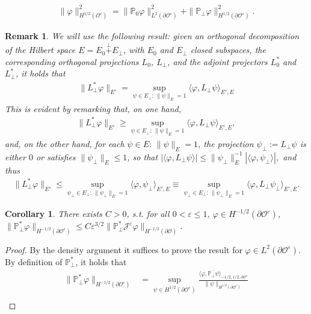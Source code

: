 \documentclass[]{article}
\newtheorem{corollary}{Corollary}
\newtheorem{remark}{Remark}
\numberwithin{equation}{section}
\numberwithin{theorem}{section}
\numberwithin{lemma}{section}
\numberwithin{corollary}{section}
\numberwithin{proposition}{section}
\numberwithin{definition}{section}
\newcommand{\re}{\varepsilon}
\renewcommand{\O}{\mathcal{O}}
\begin{document}
\begin{appendices}
\begin{align}
			\label{eq:split_norm_H_half}
			\|\varphi\|^2_{H^{1/2}(\O^{\re})}=\|\mathbb{P}_0\varphi\|^2_{L^2(\partial\mathcal{O}^{\re})}+\|\mathbb{P}_{\perp}\varphi\|^2_{H^{1/2}(\partial\mathcal{O}^{\re})}.
		\end{align}
		\begin{remark}
			\label{rem:general_rsult}
			We will use the following result: given an orthogonal decomposition of the Hilbert space $E=E_0\overset{\perp}{+}E_{\perp}$, with $E_0$ and $E_{\perp}$ closed subspaces, the corresponding orthogonal projections $L_0$,  $L_{\perp}$, and the adjoint projectors $L_0^*$ and $L^*_{\perp}$, it holds that 
			\begin{align*}
				\|L_{\perp}^*\varphi\|_{E'}=\sup\limits_{\psi\in E_{\perp}: \,\|\psi\|_E=1}\langle \varphi, L_{\perp}\psi\rangle_{E', E}
			\end{align*}
			This is evident by remarking that, on one hand, 
			\begin{align*}
				\|L_{\perp}^*\varphi\|_{E'}\geq \sup\limits_{\psi\in E_{\perp}: \,\|\psi\|_E=1}\langle \varphi, L_{\perp}\psi\rangle_{E', E},
			\end{align*}
			and, on the other hand, for each $\psi\in E: \, \|\psi\|_{E}=1$, the projection $\psi_{\perp}:=L_{\perp}\psi$ is either $0$ or satisfies $\|\psi_{\perp}\|_E\leq 1$, so that $
			|\langle \varphi, L_{\perp}\psi\rangle|\leq \|\psi_{\perp}\|^{-1}_E	|\langle \varphi, \psi_{\perp}\rangle|,$ 
			and thus 
			\begin{align*}
				\|L_{\perp}^*\varphi\|_{E'}\leq \sup\limits_{\psi_{\perp}\in E_{\perp}: \,\|\psi_{\perp}\|_E=1}\langle \varphi, \psi_{\perp}\rangle_{E', E}\equiv \sup\limits_{\psi_{\perp}\in E_{\perp}: \,\|\psi_{\perp}\|_E=1}\langle \varphi, L_{\perp}\psi_{\perp}\rangle_{E', E}.
			\end{align*}
		\end{remark}
		\begin{corollary}
			\label{cor:pperp}
			There exists $C>0$, s.t. for all $0<\re\leq 1$, $\varphi\in H^{-1/2}(\partial \O^{\re})$,  $\|\mathbb{P}_{\perp}^*{\varphi}\|_{H^{-1/2}(\partial\mathcal{O}^{\re})}\leq C\re^{3/2}\|\mathbb{P}_{\perp}^*\mathcal{J}^{\re}{\varphi}\|_{H^{-1/2}(\partial\mathcal{O})}$.
		\end{corollary}
		\begin{proof}
			By the density argument it suffices to prove the result for $\varphi\in L^2(\partial\O^{\re})$. 
			By definition of $\mathbb{P}_{\perp}^*$, it holds that 
			\begin{align*}
				\|\mathbb{P}_{\perp}^*{\varphi}\|_{H^{-1/2}(\partial\mathcal{O}^{\re})}&=\sup\limits_{{\psi}\in H^{1/2}(\partial\mathcal{O}^{\re})}\frac{\langle{\varphi}, \overline{\mathbb{P}_{\perp}{\psi}}\rangle_{-1/2,1/2,\partial\mathcal{O}^{\re}}}{\|{\psi}\|_{H^{1/2}(\partial\mathcal{O}^{\re})}}\\

\end{align*}
\end{proof}
\end{appendices}
\end{document}
